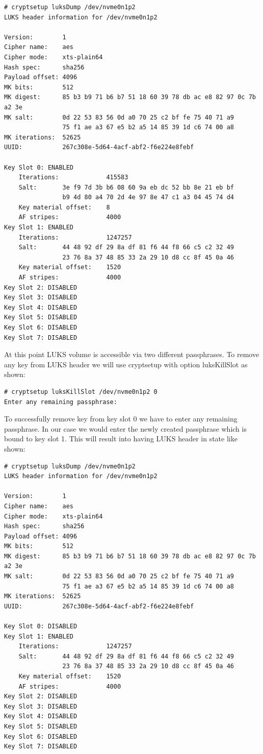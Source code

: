 \begin{lstlisting}[columns=fixed,basicstyle=\ttfamily\footnotesize,tabsize=4,backgroundcolor=\color{yellow!10}]
# cryptsetup luksDump /dev/nvme0n1p2
LUKS header information for /dev/nvme0n1p2

Version:		1
Cipher name:	aes
Cipher mode:	xts-plain64
Hash spec:		sha256
Payload offset:	4096
MK bits:		512
MK digest:		85 b3 b9 71 b6 b7 51 18 60 39 78 db ac e8 82 97 0c 7b a2 3e
MK salt:		0d 22 53 83 56 0d a0 70 25 c2 bf fe 75 40 71 a9
				75 f1 ae a3 67 e5 b2 a5 14 85 39 1d c6 74 00 a8
MK iterations: 	52625
UUID:			267c308e-5d64-4acf-abf2-f6e224e8febf

Key Slot 0: ENABLED
	Iterations:				415583
	Salt:		3e f9 7d 3b b6 08 60 9a eb dc 52 bb 8e 21 eb bf
				b9 4d 80 a4 70 2d 4e 97 8e 47 c1 a3 04 45 74 d4
	Key material offset:	8
	AF stripes:				4000
Key Slot 1: ENABLED
	Iterations:				1247257
	Salt:		44 48 92 df 29 8a df 81 f6 44 f8 66 c5 c2 32 49
				23 76 8a 37 48 85 33 2a 29 10 d8 cc 8f 45 0a 46
	Key material offset:	1520
	AF stripes:				4000
Key Slot 2: DISABLED
Key Slot 3: DISABLED
Key Slot 4: DISABLED
Key Slot 5: DISABLED
Key Slot 6: DISABLED
Key Slot 7: DISABLED
\end{lstlisting}
At this point LUKS volume is accessible via two different passphrases.
To remove any key from LUKS header we will use cryptsetup with option luksKillSlot as shown:
\begin{lstlisting}[columns=fixed,basicstyle=\ttfamily\footnotesize,tabsize=4,backgroundcolor=\color{yellow!10}]
# cryptsetup luksKillSlot /dev/nvme0n1p2 0
Enter any remaining passphrase:
\end{lstlisting}
To successfully remove key from key slot 0 we have to enter any remaining passphrase.
In our case we would enter the newly created passphrase which is bound to key slot 1.
This will result into having LUKS header in state like shown:
\begin{lstlisting}[columns=fixed,basicstyle=\ttfamily\footnotesize,tabsize=4,backgroundcolor=\color{yellow!10}]
# cryptsetup luksDump /dev/nvme0n1p2
LUKS header information for /dev/nvme0n1p2

Version:		1
Cipher name:	aes
Cipher mode:	xts-plain64
Hash spec:		sha256
Payload offset:	4096
MK bits:		512
MK digest:		85 b3 b9 71 b6 b7 51 18 60 39 78 db ac e8 82 97 0c 7b a2 3e
MK salt:		0d 22 53 83 56 0d a0 70 25 c2 bf fe 75 40 71 a9
				75 f1 ae a3 67 e5 b2 a5 14 85 39 1d c6 74 00 a8
MK iterations: 	52625
UUID:			267c308e-5d64-4acf-abf2-f6e224e8febf

Key Slot 0: DISABLED
Key Slot 1: ENABLED
	Iterations:				1247257
	Salt:		44 48 92 df 29 8a df 81 f6 44 f8 66 c5 c2 32 49
				23 76 8a 37 48 85 33 2a 29 10 d8 cc 8f 45 0a 46
	Key material offset:	1520
	AF stripes:				4000
Key Slot 2: DISABLED
Key Slot 3: DISABLED
Key Slot 4: DISABLED
Key Slot 5: DISABLED
Key Slot 6: DISABLED
Key Slot 7: DISABLED
\end{lstlisting}

